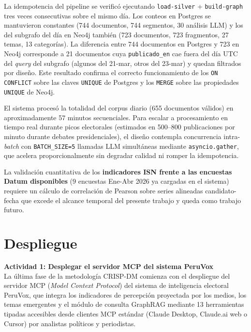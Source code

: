 La idempotencia del pipeline se verificó ejecutando \texttt{load-silver} +
\texttt{build-graph} tres veces consecutivas sobre el mismo día. Los conteos en
Postgres se mantuvieron constantes (744 documentos, 744 segmentos, 30 análisis
LLM) y los del subgrafo del día en Neo4j también (723 documentos, 723 fragmentos,
27 temas, 13 categorías). La diferencia entre 744 documentos en Postgres y 723 en
Neo4j corresponde a 21 documentos cuya \texttt{publicado\_en} cae fuera del día
UTC del \textit{query} del subgrafo (algunos del 21-mar, otros del 23-mar) y
quedan filtrados por diseño. Este resultado confirma el correcto funcionamiento
de los \texttt{ON CONFLICT} sobre las claves \texttt{UNIQUE} de Postgres y los
\texttt{MERGE} sobre las propiedades \texttt{UNIQUE} de Neo4j.

El sistema procesó la totalidad del corpus diario (655 documentos válidos) en
aproximadamente 57 minutos secuenciales. Para escalar a procesamiento en tiempo
real durante picos electorales (estimados en 500--800 publicaciones por minuto
durante debates presidenciales), el diseño contempla concurrencia
intra-\textit{batch} con \texttt{BATCH\_SIZE=5} llamadas LLM simultáneas
mediante \texttt{asyncio.gather}, que acelera proporcionalmente sin degradar
calidad ni romper la idempotencia.

La validación cuantitativa de los \textbf{indicadores ISN frente a las encuestas
Datum disponibles} (9 encuestas Ene-Abr 2026 ya cargadas en el sistema) requiere
un cálculo de correlación de Pearson sobre series alineadas candidato-fecha que
excede el alcance temporal del presente trabajo y queda como trabajo futuro.

\section{Despliegue}

\textbf{Actividad 1: Desplegar el servidor MCP del sistema PeruVox}
\\
La última fase de la metodología CRISP-DM comienza con el despliegue del servidor
MCP (\textit{Model Context Protocol}) del sistema de inteligencia electoral
PeruVox, que integra los indicadores de percepción proyectada por los medios, los temas emergentes y
el módulo de consulta GraphRAG mediante 13 herramientas tipadas accesibles desde
clientes MCP estándar (Claude Desktop, Claude.ai web o Cursor) por analistas
políticos y periodistas.

